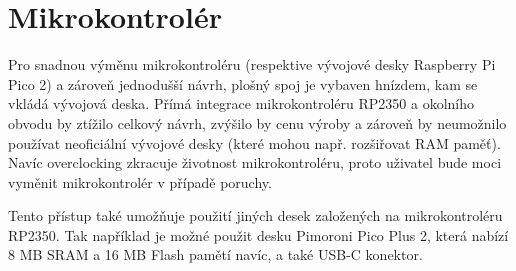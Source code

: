 %
%
%

\section{Mikrokontrolér}

Pro snadnou výměnu mikrokontroléru (respektive vývojové desky Raspberry Pi Pico 2) a zároveň
jednodušší návrh, plošný spoj je vybaven hnízdem, kam se vkládá vývojová deska. Přímá integrace
mikrokontroléru RP2350 a okolního obvodu by ztížilo celkový návrh, zvýšilo by cenu výroby a zároveň
by neumožnilo používat neoficiální vývojové desky (které mohou např. rozšiřovat RAM paměť). Navíc
overclocking zkracuje životnost mikrokontroléru, proto uživatel bude moci vyměnit mikrokontrolér v
případě poruchy.

Tento přístup také umožňuje použití jiných desek založených na mikrokontroléru RP2350. Tak například
je možné použit desku Pimoroni Pico Plus 2, která nabízí 8 MB SRAM a 16 MB Flash pamětí navíc, a
také USB-C konektor.
